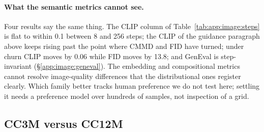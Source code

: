 \paragraph{What the semantic metrics cannot see.} Four results say the same thing. The CLIP column
of Table~\ref{tab:app:image:steps} is flat to within 0.1 between 8 and 256 steps; the CLIP of the
guidance paragraph above keeps rising past the point where CMMD and FID have turned; under churn
CLIP moves by 0.06 while FID moves by 13.8; and GenEval is step-invariant
(\S\ref{app:image:geneval}). The embedding and compositional metrics cannot resolve image-quality
differences that the distributional ones register clearly. Which family better tracks human
preference we do not test here; settling it needs a preference model over hundreds of samples, not
inspection of a grid.

\subsection{CC3M versus CC12M}
\label{app:image:scaling}

